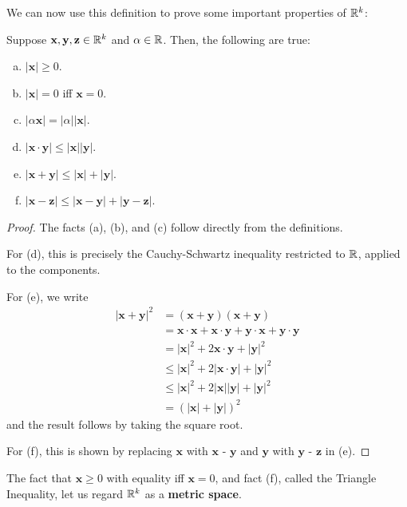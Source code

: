 We can now use this definition to prove some important properties of $\mathbb{R}^k$:
\begin{theorem}
Suppose $\textbf{x}, \textbf{y}, \textbf{z} \in \mathbb{R}^k$ and $\alpha \in \mathbb{R}$. Then, the following are true:
\begin{enumerate}[(a)]
\item $|\textbf{x}| \ge 0$.
\item $|\textbf{x}| = 0$ iff $\textbf{x} = 0$.
\item $|\alpha \textbf{x}| = |\alpha| |\textbf{x}|$.
\item $|\textbf{x} \cdot \textbf{y}| \le |\textbf{x}| |\textbf{y}|$.
\item $|\textbf{x} + \textbf{y}| \le |\textbf{x}| + |\textbf{y}|$.
\item $|\textbf{x} - \textbf{z}| \le |\textbf{x} - \textbf{y}| + |\textbf{y} - \textbf{z}|$. 
\end{enumerate}
\begin{proof}
The facts (a), (b), and (c) follow directly from the definitions.

For (d), this is precisely the Cauchy-Schwartz inequality restricted to $\mathbb{R}$, applied to the components.

For (e), we write
\begin{align*}
	|\textbf{x} + \textbf{y}|^2 &= (\textbf{x} + \textbf{y})(\textbf{x} + \textbf{y}) \\
		&= \textbf{x} \cdot \textbf{x} + \textbf{x} \cdot \textbf{y} + \textbf{y} \cdot \textbf{x} + \textbf{y} \cdot \textbf{y} \\
		&= |\textbf{x}|^2 + 2 \textbf{x} \cdot \textbf{y} + |\textbf{y}|^2 \\
		&\le |\textbf{x}|^2 + 2 \left|\textbf{x} \cdot \textbf{y}\right| + |\textbf{y}|^2 \\
		&\le |\textbf{x}|^2 + 2 |\textbf{x}| |\textbf{y}| + |\textbf{y}|^2 \\
		&= (|\textbf{x}| + |\textbf{y}|)^2
\end{align*}
and the result follows by taking the square root.

For (f), this is shown by replacing $\textbf{x}$ with $\textbf{x - y}$ and $\textbf{y}$ with $\textbf{y - z}$ in (e).
\end{proof}
\end{theorem}

The fact that $\textbf{x} \ge 0$ with equality iff $\textbf{x} = 0$, and fact (f), called the Triangle Inequality, let us regard $\mathbb{R}^k$ as a \textbf{metric space}. 

